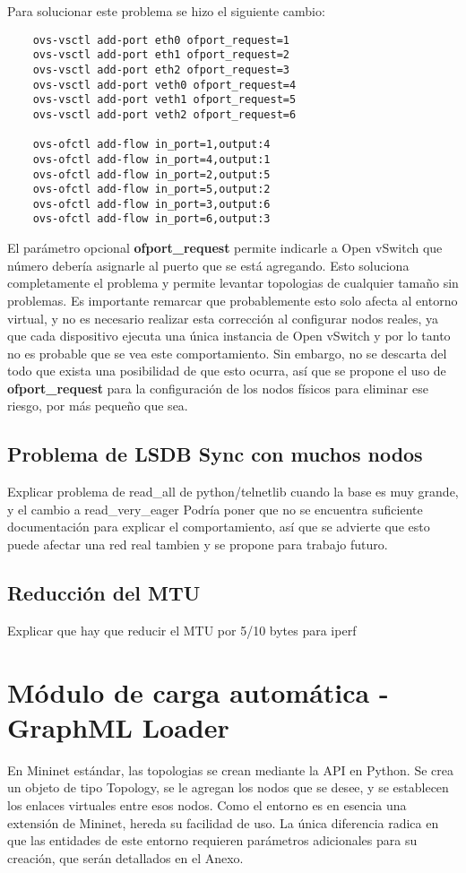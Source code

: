 Para solucionar este problema se hizo el siguiente cambio:
\begin{lstlisting}
	ovs-vsctl add-port eth0 ofport_request=1
	ovs-vsctl add-port eth1 ofport_request=2
	ovs-vsctl add-port eth2 ofport_request=3
	ovs-vsctl add-port veth0 ofport_request=4
	ovs-vsctl add-port veth1 ofport_request=5
	ovs-vsctl add-port veth2 ofport_request=6
	
	ovs-ofctl add-flow in_port=1,output:4
	ovs-ofctl add-flow in_port=4,output:1
	ovs-ofctl add-flow in_port=2,output:5
	ovs-ofctl add-flow in_port=5,output:2
	ovs-ofctl add-flow in_port=3,output:6
	ovs-ofctl add-flow in_port=6,output:3
\end{lstlisting}
El parámetro opcional \textbf{ofport\_request} permite indicarle a Open vSwitch que número debería asignarle al puerto que se está agregando. Esto soluciona completamente el problema y permite levantar topologias de cualquier tamaño sin problemas. Es importante remarcar que probablemente esto solo afecta al entorno virtual, y no es necesario realizar esta corrección al configurar nodos reales, ya que cada dispositivo ejecuta una única instancia de Open vSwitch y por lo tanto no es probable que se vea este comportamiento. Sin embargo, no se descarta del todo que exista una posibilidad de que esto ocurra, así que se propone el uso de \textbf{ofport\_request} para la configuración de los nodos físicos para eliminar ese riesgo, por más pequeño que sea.

\subsection{Problema de LSDB Sync con muchos nodos}
Explicar problema de read\_all\(\) de python/telnetlib cuando la base es muy grande, y el cambio a read\_very\_eager\(\)
Podría poner que no se encuentra suficiente documentación para explicar el comportamiento, así que se advierte que esto puede afectar una red real tambien y se propone para trabajo futuro.

\subsection{Reducción del MTU}
Explicar que hay que reducir el MTU por 5/10 bytes para iperf

\section{Módulo de carga automática - GraphML Loader}
En Mininet estándar, las topologias se crean mediante la API en Python. Se crea un objeto de tipo Topology, se le agregan los nodos que se desee, y se establecen los enlaces virtuales entre esos nodos. Como el entorno es en esencia una extensión de Mininet, hereda su facilidad de uso. La única diferencia radica en que las entidades de este entorno requieren parámetros adicionales para su creación, que serán detallados en el Anexo.
